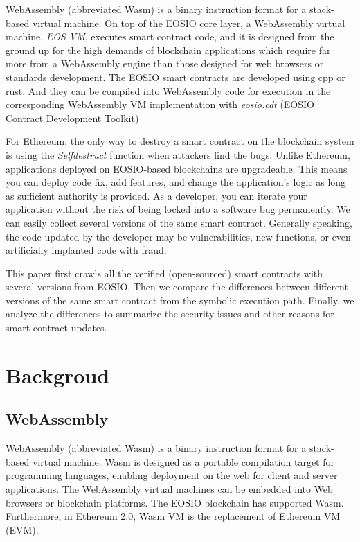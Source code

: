 \documentclass[a4paper, 10pt, conference, twocolumn]{ieeeconf}       %
\begin{document}
WebAssembly (abbreviated Wasm) is a binary instruction format for a stack-based virtual machine.
On top of the EOSIO core layer, a WebAssembly virtual machine, \emph{EOS VM}, executes smart contract code, and it is designed from the ground up for the high demands of blockchain applications which require far more from a WebAssembly engine than those designed for web browsers or standards development.
The EOSIO smart contracts are developed using cpp or rust.
And they can be compiled into WebAssembly code for execution in the corresponding WebAssembly VM implementation with \emph{eosio.cdt} (EOSIO Contract Development Toolkit)

For Ethereum, the only way to destroy a smart contract on the blockchain system is using the \emph{Selfdestruct} function when attackers find the bugs.
Unlike Ethereum, applications deployed on EOSIO-based blockchains are upgradeable.
This means you can deploy code fix, add features, and change the application’s logic as long as sufficient authority is provided.
As a developer, you can iterate your application without the risk of being locked into a software bug permanently.
We can easily collect several versions of the same smart contract.
Generally speaking, the code updated by the developer may be vulnerabilities, new functions, or even artificially implanted code with fraud.

This paper first crawls all the verified (open-sourced) smart contracts with several versions from EOSIO.
Then we compare the differences between different versions of the same smart contract from the symbolic execution path.
Finally, we analyze the differences to summarize the security issues and other reasons for smart contract updates.

\section{Backgroud}


\subsection{WebAssembly}

WebAssembly (abbreviated Wasm) is a binary instruction format for a stack-based virtual machine.
Wasm is designed as a portable compilation target for programming languages, enabling deployment on the web for client and server applications\cite{webassembly}.
The WebAssembly virtual machines can be embedded into Web browsers or blockchain platforms. The EOSIO blockchain has supported Wasm.
Furthermore, in Ethereum 2.0, Wasm VM is the replacement of Ethereum VM (EVM).
\end{document}
